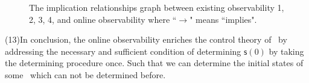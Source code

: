 \begin{figure}[thpb]
      \centering
      \caption{The implication relationships graph between existing observability 1, 2, 3, 4, and online observability where ``$\rightarrow$" means ``implies".}
      \label{fig:7}
   \end{figure}


  {\color{red} (13)}In conclusion, the online observability enriches the control theory of \BCNs\ by addressing the necessary and sufficient condition of determining $\mathsf{s}(0)$ by taking the determining procedure once. Such that we can determine the initial states of some \BCNs\ which can not be determined before. 